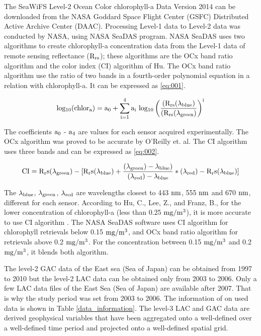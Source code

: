 The SeaWiFS Level-2 Ocean Color chlorophyll-a Data Version 2014 can be downloaded from the NASA Goddard Space Flight Center (GSFC) Distributed Active Archive Center (DAAC). Processing Level-1 data to Level-2 data was conducted by NASA, using NASA SeaDAS program\cite{NASASeaFiWSdata}. NASA SeaDAS uses two algorithms to create chlorophyll-a concentration data from the Level-1 data of remote sensing reflectance ($\rm R_{rs}$); these algorithms are the OCx band ratio algorithm and the color index (CI) algorithm of Hu. 
 The OCx band ratio algorithm use the ratio of two bands in a fourth-order polynomial equation in a relation with chlorophyll-a. It can be expressed as \eqref{eq:001}.
 
 \begin{equation}
 {\rm log_{10} (chlor_a) = a_0 + \sum_{i=1}^4 a_i ~ log_{10} \left( \frac{(R_{rs}(\lambda_{blue})}{(R_{rs}(\lambda_{green})} \right) ^i }
 \label{eq:001}
 \end{equation}
 
The coefficients $\rm a_0$ - $\rm a_4$ are values for each sensor acquired experimentally. The OCx algorithm was proved to be accurate by O’Reilly et. al\cite{o2000ocean}. The CI algorithm uses three bands and can be expressed as \eqref{eq:002}.

 \begin{equation}
{\rm CI = R_rs ({\lambda}_{green}) - [R_rs ({\lambda}_{blue}) + \frac {({\lambda}_{green}) - {\lambda}_{blue})} {({\lambda}_{red}) - {\lambda}_{blue}} * ({\lambda}_{red}) - R_rs ({\lambda}_{blue}) ]}
\label{eq:002}
\end{equation}

The $\rm {\lambda}_{blue}$, $\rm {\lambda}_{green}$, $\rm {\lambda}_{red}$ are wavelengths closest to 443 $\rm nm$, 555 $\rm nm$ and 670 $\rm nm$, different for each sensor. According to Hu, C., Lee, Z., and Franz, B., for the lower concentration of chlorophyll-a (less than 0.25 $\rm mg/m^3$), it is more accurate to use CI algorithm \cite{hu2012chlorophyll}. The NASA SeaDAS software uses CI algorithm for chlorophyll retrievals below 0.15 $\rm mg/m^3$, and OCx band ratio algorithm for retrievals above 0.2 $\rm mg/m^3$. For the concentration between 0.15 $\rm mg/m^3$ and 0.2 $\rm mg/m^3$, it blends both algorithm.

The level-2 GAC data of the East sea (Sea of Japan) can be obtained from 1997 to 2010 but the level-2 LAC data can be obtained only from 2003 to 2006. Only a few LAC data files of the East Sea (Sea of Japan) are available after 2007. That is why the study period was set from 2003 to 2006. The information of on used data is shown in Table \ref{data_information}.
The level-3 LAC and GAC data are derived geophysical variables that have been aggregated onto a well-defined over a well-defined time period and projected onto a well-defined spatial grid.

